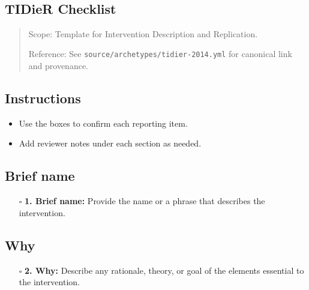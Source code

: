 \documentclass[11pt]{article}
\def\tightlist{}
\begin{document}
\begin{center}
{\LARGE }\\[4pt]
\normalsize 
\end{center}
\vspace{1em}

\begin{Form}

\section{TIDieR Checklist}\label{tidier-checklist}

\begin{quote}
Scope: Template for Intervention Description and Replication.

Reference: See \texttt{source/archetypes/tidier-2014.yml} for canonical
link and provenance.
\end{quote}

\subsection{Instructions}\label{instructions}

\begin{itemize}
\tightlist
\item
  Use the boxes to confirm each reporting item.
\item
  Add reviewer notes under each section as needed.
\end{itemize}

\subsection{Brief name}\label{brief-name}

\begin{itemize}
\tightlist
\item[$\square$]
  \textbf{1. Brief name:} Provide the name or a phrase that describes
  the intervention.
\end{itemize}

\subsection{Why}\label{why}

\begin{itemize}
\tightlist
\item[$\square$]
  \textbf{2. Why:} Describe any rationale, theory, or goal of the
  elements essential to the intervention.
\end{itemize}


\end{Form}
\end{document}
